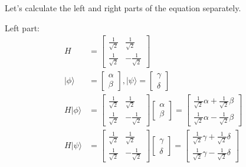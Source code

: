 \documentclass{article}
\begin{document}
Let's calculate the left and right parts of the equation separately.

Left part:
\begin{equation}
    \begin{split}
        H & = \begin{bmatrix}
            \frac{1}{\sqrt{2}} & \frac{1}{\sqrt{2}} \\
            \frac{1}{\sqrt{2}} & -\frac{1}{\sqrt{2}}
        \end{bmatrix} \\
        |\phi\rangle & = \begin{bmatrix}
            \alpha \\ \beta
        \end{bmatrix}, |\psi\rangle = \begin{bmatrix}
            \gamma \\ \delta
        \end{bmatrix} \\
        H|\phi\rangle & = \begin{bmatrix}
            \frac{1}{\sqrt{2}} & \frac{1}{\sqrt{2}} \\
            \frac{1}{\sqrt{2}} & -\frac{1}{\sqrt{2}}
        \end{bmatrix} \begin{bmatrix}
            \alpha \\ \beta
        \end{bmatrix} = \begin{bmatrix}
            \frac{1}{\sqrt{2}}\alpha + \frac{1}{\sqrt{2}}\beta \\
            \frac{1}{\sqrt{2}}\alpha - \frac{1}{\sqrt{2}}\beta
        \end{bmatrix} \\
        H|\psi\rangle & = \begin{bmatrix}
            \frac{1}{\sqrt{2}} & \frac{1}{\sqrt{2}} \\
            \frac{1}{\sqrt{2}} & -\frac{1}{\sqrt{2}}
        \end{bmatrix} \begin{bmatrix}
            \gamma \\ \delta
        \end{bmatrix} = \begin{bmatrix}
            \frac{1}{\sqrt{2}}\gamma + \frac{1}{\sqrt{2}}\delta \\
            \frac{1}{\sqrt{2}}\gamma - \frac{1}{\sqrt{2}}\delta
        \end{bmatrix} \\

\end{split}
\end{equation}
\end{document}
